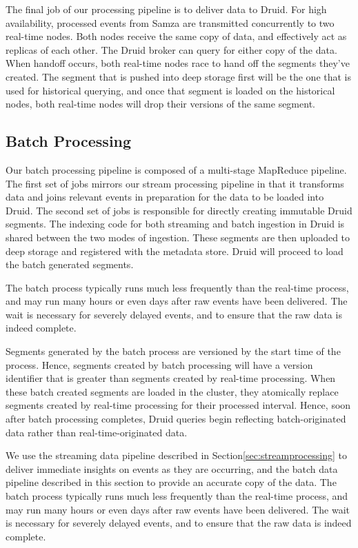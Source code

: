 \documentclass{vldb}
\begin{document}
The final job of our processing pipeline is to deliver data to Druid. For high
availability, processed events from Samza are transmitted concurrently to two
real-time nodes. Both nodes receive the same copy of data, and effectively act
as replicas of each other. The Druid broker can query for either copy of the data.
When handoff occurs, both real-time nodes race to hand off the segments they’ve
created. The segment that is pushed into deep storage first will be the one
that is used for historical querying, and once that segment is loaded on the
historical nodes, both real-time nodes will drop their versions of the same
segment.

\subsection{Batch Processing}
Our batch processing pipeline is composed of a multi-stage
MapReduce\cite{dean2008mapreduce} pipeline. The first set of jobs mirrors our
stream processing pipeline in that it transforms data and joins relevant events
in preparation for the data to be loaded into Druid. The second set of jobs is
responsible for directly creating immutable Druid segments. The indexing code
for both streaming and batch ingestion in Druid is shared between the two modes
of ingestion. These segments are then uploaded to deep storage and registered
with the metadata store. Druid will proceed to load the batch generated
segments.

The batch process typically runs much less frequently than the real-time
process, and may run many hours or even days after raw events have been
delivered. The wait is necessary for severely delayed events, and to ensure
that the raw data is indeed complete. 

Segments generated by the batch process are versioned by the start time of the
process. Hence, segments created by batch processing will have a version
identifier that is greater than segments created by real-time processing. When
these batch created segments are loaded in the cluster, they atomically replace
segments created by real-time processing for their processed interval. Hence,
soon after batch processing completes, Druid queries begin reflecting
batch-originated data rather than real-time-originated data.

We use the streaming data pipeline described in
Section\ref{sec:streamprocessing} to deliver immediate insights on events as
they are occurring, and the batch data pipeline described in this section to
provide an accurate copy of the data. The batch process typically runs much
less frequently than the real-time process, and may run many hours or even days
after raw events have been delivered. The wait is necessary for severely
delayed events, and to ensure that the raw data is indeed complete. 
\end{document}
